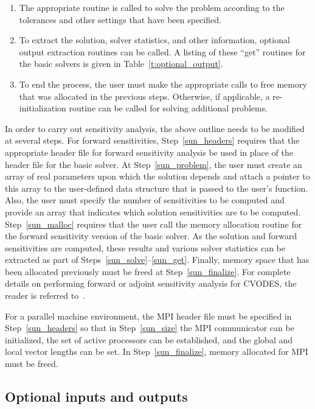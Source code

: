 \begin{enumerate}
\item \label{sun_solve}
The appropriate routine is called to solve the problem according to
the tolerances and other settings that have been specified.

\item \label{sun_get}
To extract the solution, solver statistics, and other information,
optional output extraction routines can be called. A listing of these
``get'' routines for the basic solvers is given 
in Table~\ref{t:optional_output}.

\item \label{sun_finalize}
To end the process, the user must make the appropriate calls to
free memory that was allocated in the previous steps. Otherwise, if
applicable, a re-initialization routine can be called for solving
additional problems.

\end{enumerate}

In order to carry out sensitivity analysis, the above outline
needs to be modified at several steps. For forward sensitivities,
Step~\ref{sun_headers} requires that the appropriate header
file for forward sensitivity analysis be used in place of the header
file for the basic solver. At Step~\ref{sun_problem}, the user must
create an array of real parameters upon which the solution depends
and attach a pointer to this array to the user-defined data structure
that is passed to the user's function. Also, the user must specify the
number of sensitivities to be computed and provide an array that
indicates which solution sensitivities are to be
computed. Step~\ref{sun_malloc} requires that the user call the memory
allocation routine for the forward sensitivity version of the basic
solver. As the solution and forward sensitivities are computed,
these results and various solver statistics can be extracted as part
of Steps~\ref{sun_solve}--\ref{sun_get}. Finally, memory space that
has been allocated previously must be freed at
Step~\ref{sun_finalize}. For complete details on performing forward or
adjoint sensitivity analysis for CVODES, the reader is referred to~\cite{SeHi:03}.

For a parallel machine environment, the MPI header file must be
specified in Step~\ref{sun_headers} so that in Step~\ref{sun_size} the MPI
communicator can be initialized, the set of active processors can be
established, and the global and local vector lengths can be set.
In Step~\ref{sun_finalize}, memory allocated for MPI must be freed.

\subsection{Optional inputs and outputs}\label{ss:optional_io}

